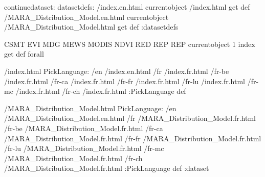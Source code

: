 \begin{ingrid}
continuedataset:
datasetdefs:
/index.en.html currentobject /index.html get def
/MARA_Distribution_Model.en.html currentobject /MARA_Distribution_Model.html get def
:datasetdefs

{ CSMT EVI MDG MEWS MODIS NDVI RED REP REP } { currentobject 1 index get def } forall

/index.html {
PickLanguage:
/en /index.en.html
/fr /index.fr.html
/fr-be /index.fr.html
/fr-ca /index.fr.html
/fr-fr /index.fr.html
/fr-lu /index.fr.html
/fr-mc /index.fr.html
/fr-ch /index.fr.html
:PickLanguage
} def

/MARA_Distribution_Model.html {
PickLanguage:
/en /MARA_Distribution_Model.en.html
/fr /MARA_Distribution_Model.fr.html
/fr-be /MARA_Distribution_Model.fr.html
/fr-ca /MARA_Distribution_Model.fr.html
/fr-fr /MARA_Distribution_Model.fr.html
/fr-lu /MARA_Distribution_Model.fr.html
/fr-mc /MARA_Distribution_Model.fr.html
/fr-ch /MARA_Distribution_Model.fr.html
:PickLanguage
} def
:dataset
\end{ingrid}
